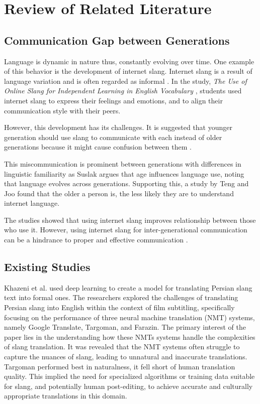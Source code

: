 \chapter{Review of Related Literature}
\label{sec:relatedlit}

\section{Communication Gap between Generations}
Language is dynamic in nature thus, constantly evolving over time. One example of this behavior is the development of internet slang. Internet slang is a result of language variation and is often regarded as informal \cite{Liu_Gui_Zuo_Dai_2019}. In the study, \textit{The Use of Online Slang for Independent Learning in English Vocabulary} \cite{Ambarsari_Amrullah_Nawawi_2020}, students used internet slang to express their feelings and emotions, and to align their communication style with their peers. 

However, this development has its challenges. It is suggested that younger generation should use slang to communicate with each instead of older generations because it might cause confusion between them \cite{Jeresano_Carretero_2022}.

This miscommunication is prominent between generations with differences in linguistic familiarity as Suslak \cite{SUSLAK2009199} argues that age influences language use, noting that language evolves across generations.
Supporting this, a study by Teng and Joo \cite{Teng_Joo2023} found that the older a person is, the less likely they are to understand internet language.

The studies showed that using internet slang improves relationship between those who use it. However, using internet slang for inter-generational communication can be a hindrance to proper and effective communication \cite{gonzagaforda}.


\section{Existing Studies}
Khazeni et al. \cite{Khazeni} used deep learning to create a model for translating Persian slang text into formal ones. The researchers explored the challenges of translating Persian slang into English within the context of film subtitling, specifically focusing on the performance of three neural machine translation (NMT) systems, namely Google Translate, Targoman, and Farazin. The primary interest of the paper lies in the understanding how these NMTs systems handle  the complexities of slang translation. It was revealed that the NMT systems often struggle to capture the nuances of slang, leading to unnatural and inaccurate translations. Targoman performed best in naturalness, it fell short of human translation quality. This implied the need for specialized algorithms or training data suitable for slang, and potentially human post-editing, to achieve accurate and culturally appropriate translations in this domain.
 
